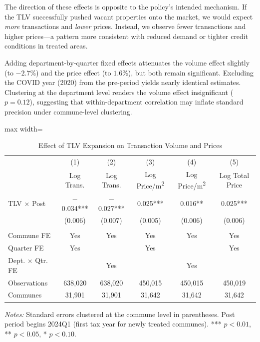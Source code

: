 \documentclass[12pt]{article}
\begin{document}
The direction of these effects is opposite to the policy's intended mechanism. If the TLV successfully pushed vacant properties onto the market, we would expect \textit{more} transactions and \textit{lower} prices. Instead, we observe fewer transactions and higher prices---a pattern more consistent with reduced demand or tighter credit conditions in treated areas.

Adding department-by-quarter fixed effects attenuates the volume effect slightly (to $-2.7\%$) and the price effect (to $1.6\%$), but both remain significant. Excluding the COVID year (2020) from the pre-period yields nearly identical estimates. Clustering at the department level renders the volume effect insignificant ($p = 0.12$), suggesting that within-department correlation may inflate standard precision under commune-level clustering.

\begin{table}[H]
\centering
\caption{Effect of TLV Expansion on Transaction Volume and Prices}
\label{tab:did_main}
\begin{adjustbox}{max width=\textwidth}
\begin{tabular}{lccccc}
\toprule
 & (1) & (2) & (3) & (4) & (5) \\
 & Log Trans. & Log Trans. & Log Price/m\textsuperscript{2} & Log Price/m\textsuperscript{2} & Log Total Price \\
\midrule
TLV $\times$ Post & $-$0.034*** & $-$0.027*** & 0.025*** & 0.016** & 0.025*** \\
 & (0.006) & (0.007) & (0.005) & (0.006) & (0.006) \\
\\
Commune FE & Yes & Yes & Yes & Yes & Yes \\
Quarter FE & Yes & & Yes & & Yes \\
Dept. $\times$ Qtr. FE & & Yes & & Yes & \\
Observations & 638,020 & 638,020 & 450,015 & 450,015 & 450,019 \\
Communes & 31,901 & 31,901 & 31,642 & 31,642 & 31,642 \\
\bottomrule
\end{tabular}
\end{adjustbox}
\begin{minipage}{0.95\textwidth}
\vspace{0.3em}
\footnotesize
\textit{Notes:} Standard errors clustered at the commune level in parentheses. Post period begins 2024Q1 (first tax year for newly treated communes). *** $p<0.01$, ** $p<0.05$, * $p<0.10$.
\end{minipage}
\end{table}
\end{document}
